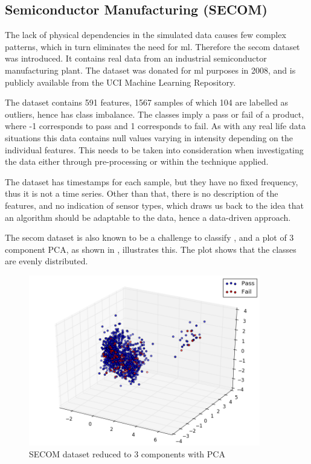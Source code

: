 \documentclass[english, a4paper]{report}
\begin{document}
{{        \subsection{Semiconductor Manufacturing (SECOM)} \label{secomData}
        {
            The lack of physical dependencies in the simulated data causes few complex patterns, which in turn eliminates the need for \gls{ml}. Therefore the \gls{secom} dataset was introduced. It contains real data from an industrial semiconductor manufacturing plant. The dataset was donated for \gls{ml} purposes in 2008, and is publicly available from the UCI Machine Learning Repository.
            \par
            The dataset contains 591 features, 1567 samples of which 104 are labelled as outliers, hence has class imbalance. The classes imply a pass or fail of a product, where -1 corresponds to pass and 1 corresponds to fail. As with any real life data situations this data contains null values varying in intensity depending on the individual features. This needs to be taken into consideration when investigating the data either through pre-processing or within the technique applied\cite{uciML}.
            \par
            The dataset has timestamps for each sample, but they have no fixed frequency, thus it is not a time series. Other than that, there is no description of the features, and no indication of sensor types, which draws us back to the idea that an algorithm should be adaptable to the data, hence a data-driven approach.
            \par
            The \gls{secom} dataset is also known to be a challenge to classify \cite{supervisedMLsecom}, and a plot of 3 component PCA, as shown in , illustrates this. The plot shows that the classes are evenly distributed.
            \begin{figure}[H]
                \centering
                \includegraphics[width = 0.9\textwidth]{SECOM_PCA_3_plot}
                \caption{SECOM dataset reduced to 3 components with PCA}
                \label{fig:secom-PCA-plot}
            \end{figure}
        }
    
}}
\end{document}
